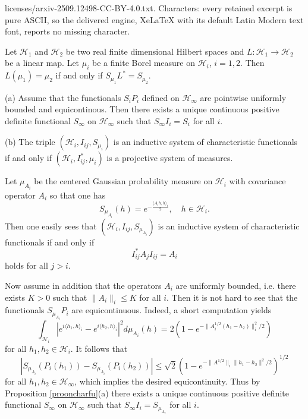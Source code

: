 \documentclass[10pt,a4paper]{amsart}
\begin{document}
licenses/arxiv-2509.12498-CC-BY-4.0.txt. Characters: every retained excerpt is pure ASCII, so the delivered engine, XeLaTeX with its default Latin Modern text font, reports no missing character.
\begin{lemma}\label{funcpropcharfu}
Let $\mathcal{H}_1$ and $\mathcal{H}_2$ be two  real finite dimensional Hilbert spaces and $L: \mathcal{H}_1 \rightarrow \mathcal{H}_2$ be a linear map. Let $\mu_i$ be a finite Borel measure on $\mathcal{H}_i$, $i=1,2$. Then $L(\mu_1)=\mu_2$ if and only if $S_{\mu_1}L^*=S_{\mu_2}$.
\end{lemma}

\begin{proposition}\label{prooncharfu} (a) Assume that the functionals $S_iP_i$ defined on $\mathcal{H}_{\infty}$ are pointwise uniformly bounded and equicontinous. Then there exists a unique continuous positive definite functional $S_{\infty}$ on $\mathcal{H}_{\infty}$ such that $S_{\infty}I_i=S_i$ for all $i$.
	
(b) The triple $(\mathcal{H}_i,I_{ij},S_{\mu_i})$ is an inductive system of characteristic functionals if and only if $(\mathcal{H}_i,I_{ij}^{*},\mu_i)$ is a  projective system of measures.
\end{proposition}

\begin{example}\label{gaumesexam}
Let $\mu_{A_i}$ be the centered Gaussian probability measure on $\mathcal{H}_i$ with covariance operator $A_i$ so that one has 
$$ S_{\mu_{A_i}}(h)=e^{-\frac{\langle A_i h, h\rangle_i}{2}}, 
	\quad h \in \mathcal{H}_i.$$
Then one easily sees that $(\mathcal{H}_i,I_{ij},S_{\mu_{A_i}})$ is an inductive system of characteristic functionals if and only if 
\begin{equation}\label{consgaucova}
I_{ij}^{*} A_j I_{ij}=A_i
\end{equation}
holds for all $j>i$.

Now assume in addition that the operators $A_i$ are uniformly bounded, i.e. there exists $K>0$ such that $\|A_i \|_i \leq K $ for all $i$. Then it is not hard to see that the functionals $S_{\mu_{A_i}}P_i$ are equicontinuous. Indeed, a short computation yields
$$ \int_{\mathcal{H}_i}|e^{i\langle h_1, h \rangle_{i}}
-e^{i\langle h_2, h \rangle_{i}} |^2 d\mu_{A_i}(h)=
2(1-e^{-\|A^{1/2}_{i}(h_1-h_2)\|_{i}^{2}/2})$$
for all $h_1,h_2 \in \mathcal{H}_i$. It follows that 
$$| S_{\mu_{A_i}}(P_i(h_1))-S_{\mu_{A_i}}(P_i(h_2))| \leq 
\sqrt{2}(1-e^{-\|A^{1/2}\|_{i}\|h_1-h_2\|^{2}/2})^{1/2}$$
for all $h_1,h_2 \in \mathcal{H}_{\infty}$, which implies the desired equicontinuity. Thus by Proposition \ref{prooncharfu}(a) there exists a unique continuous positive definite functional $S_{\infty}$ on $\mathcal{H}_{\infty}$ such that $S_{\infty}I_i=S_{\mu_{A_i}}$ for all $i$.
\end{example}
\end{document}
